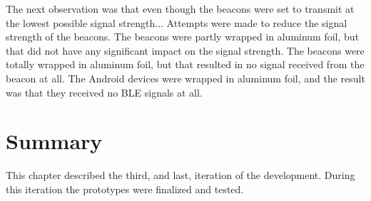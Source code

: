 \documentclass[../Main/thesis.tex]{subfiles}
\begin{document}
The next observation was that even though the beacons were set to transmit at the lowest possible signal strength...
Attempts were made to reduce the signal strength of the beacons.
The beacons were partly wrapped in aluminum foil, but that did not have any significant impact on the signal strength.
The beacons were totally wrapped in aluminum foil, but that resulted in no signal received from the beacon at all.
The Android devices were wrapped in aluminum foil, and the result was that they received no BLE signals at all.

\section{Summary}
This chapter described the third, and last, iteration of the development.
During this iteration the prototypes were finalized and tested.
\end{document}

